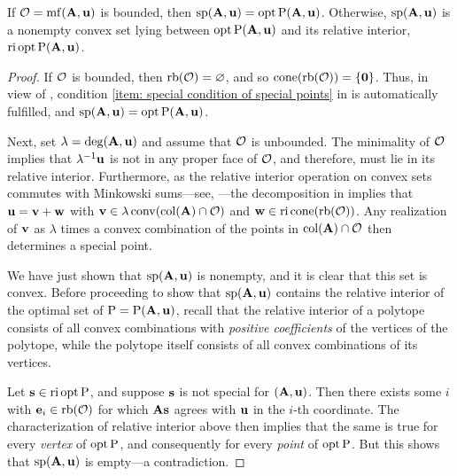 \documentclass{article}
\begin{document}
\begin{proposition}
   \label{opt versus mc: P}
   If $\mathcal{O} = \operatorname{mf}(\mathbf{A}, \mathbf{u})$ is bounded, then $\operatorname{sp}(\mathbf{A}, \mathbf{u}) = \operatorname{opt} \mathrm{P}(\mathbf{A}, \mathbf{u})$.
   Otherwise, $\operatorname{sp}(\mathbf{A}, \mathbf{u})$ is a nonempty convex set lying between $\operatorname{opt} \mathrm{P}(\mathbf{A}, \mathbf{u})$ and its relative interior, $\operatorname{ri} \operatorname{opt} \mathrm{P}(\mathbf{A}, \mathbf{u})$.
\end{proposition}

\begin{proof}
   If $\mathcal{O}$ is bounded, then $\operatorname{rb}(\mathcal{O}) = \varnothing$, and so $\operatorname{cone}( \operatorname{rb}(\mathcal{O})) = \{\mathbf{0} \}$.
   Thus, in view of , condition \eqref{item: special condition of special points} in  is automatically fulfilled, and $\operatorname{sp}(\mathbf{A}, \mathbf{u}) = \operatorname{opt} \mathrm{P}(\mathbf{A}, \mathbf{u})$.

   Next, set $\lambda = \operatorname{deg}(\mathbf{A},\mathbf{u})$ and assume that $\mathcal{O}$ is unbounded.
   The minimality of $\mathcal{O}$ implies that $\lambda^{-1}\mathbf{u}$ is not in any proper face of $\mathcal{O}$, and therefore, must lie in its relative interior.
   Furthermore, as the relative interior operation on convex sets commutes with Minkowski sums---see, \eg \cite[Theorem 4.10(b)]{vantiel.convex_analysis}---the decomposition in   implies that $\mathbf{u} = \mathbf{v} + \mathbf{w}$ with $\mathbf{v} \in \lambda \operatorname{conv}(\operatorname{col}(\mathbf{A}) \cap \mathcal{O})$ and $\mathbf{w} \in \operatorname{ri} \operatorname{cone}(\operatorname{rb}(\mathcal{O}))$.  Any realization of $\mathbf{v}$ as $\lambda$ times a convex combination of the points in $\operatorname{col}(\mathbf{A}) \cap \mathcal{O}$ then determines a special point.

   We have just shown that $\operatorname{sp}(\mathbf{A}, \mathbf{u})$ is nonempty, and it is clear that this set is convex.
   Before proceeding to show that $\operatorname{sp}(\mathbf{A}, \mathbf{u})$ contains the relative interior of the optimal set of $\mathrm{P} = \mathrm{P}(\mathbf{A},\mathbf{u})$, recall that the relative interior of a polytope consists of all convex combinations with \emph{positive coefficients} of the vertices of the polytope, while the polytope itself consists of all convex combinations of its vertices.

  Let $\mathbf{s} \in \operatorname{ri} \operatorname{opt} \mathrm{P}$, and suppose $\mathbf{s}$ is not special for $(\mathbf{A},\mathbf{u})$.
  Then there exists some $i$ with $\mathbf{e}_i \in \operatorname{rb}(\mathcal{O})$ for which $\mathbf{A}\mathbf{s}$ agrees with $\mathbf{u}$ in the $i$-th coordinate.
  The characterization of relative interior above then implies that the same is true for every \emph{vertex} of $\operatorname{opt} \mathrm{P}$, and consequently for every \emph{point} of $\operatorname{opt} \mathrm{P}$.
  But this shows that $\operatorname{sp}(\mathbf{A},\mathbf{u})$ is empty---a contradiction.
\end{proof}
\end{document}

